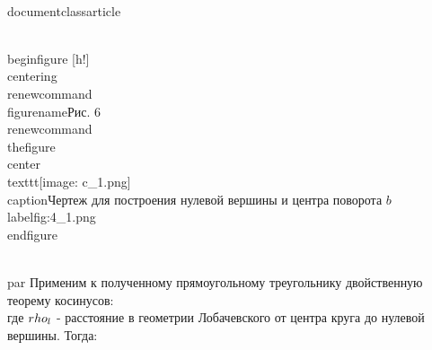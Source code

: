 \\documentclass{article}
\begin{document}
\\begin{figure} [h!]
    \\centering
    \\renewcommand{\\figurename}{Рис. 6}
    \\renewcommand{\\thefigure}{}
    \\center{\\texttt{[image: c\_1.png]}}
    \\caption{Чертеж для построения нулевой вершины и центра поворота $b$}
    \\label{fig:4_1.png}
\\end{figure}

\\par Применим к полученному прямоугольному треугольнику двойственную теорему косинусов: \\[cos(\\frac{\\pi}{2}) = -cos(\\frac{\\pi}{P})cos(\\frac{\\pi}{Q}) + sin(\\frac{\\pi}{P})sin(\\frac{\\pi}{Q})ch(\\rho_l),\\]
где $\\rho_l$ - расстояние в геометрии Лобачевского от центра круга до нулевой вершины.
Тогда:
\\[ch(\\rho_l) = \\frac{cos(\\frac{\\pi}{P})cos(\\frac{\\pi}{Q})}{sin(\\frac{\\pi}{P})sin(\\frac{\\pi}{Q})},\\]
\\[\\rho_l = arch(\\frac{cos(\\frac{\\pi}{P})cos(\\frac{\\pi}{Q})}{sin(\\frac{\\pi}{P})sin(\\frac{\\pi}{Q})})\\]
\end{document}
